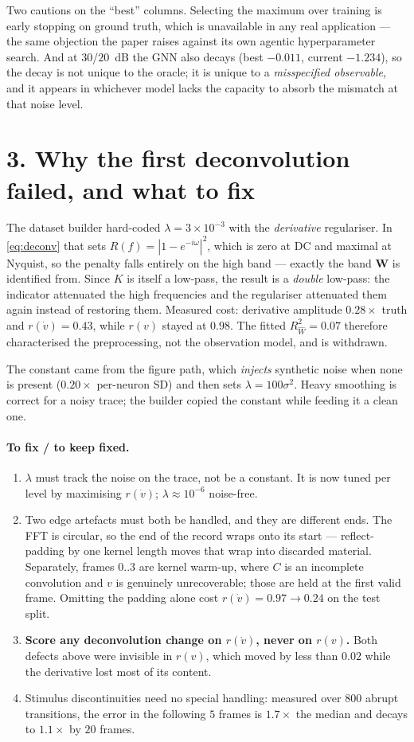\documentclass[10pt]{article}
\newcommand{\Rw}{R^2_{\widehat W}}
\newcommand{\Mat}[1]{\mathbf{#1}}
\begin{document}
Two cautions on the ``best'' columns. Selecting the maximum over training is
early stopping on ground truth, which is unavailable in any real application ---
the same objection the paper raises against its own agentic hyperparameter
search. And at $30$/$20$~dB the GNN also decays (best $-0.011$, current $-1.234$),
so the decay is not unique to the oracle; it is unique to a \emph{misspecified
observable}, and it appears in whichever model lacks the capacity to absorb the
mismatch at that noise level.

\section*{3. Why the first deconvolution failed, and what to fix}

The dataset builder hard-coded $\lambda = 3\times10^{-3}$ with the
\emph{derivative} regulariser. In \eqref{eq:deconv} that sets
$R(f) = |1-e^{-i\omega}|^2$, which is zero at DC and maximal at Nyquist, so the
penalty falls entirely on the high band --- exactly the band $\Mat{W}$ is
identified from. Since $K$ is itself a low-pass, the result is a \emph{double}
low-pass: the indicator attenuated the high frequencies and the regulariser
attenuated them again instead of restoring them. Measured cost: derivative
amplitude $0.28\times$ truth and $r(\dot v) = 0.43$, while $r(v)$ stayed at
$0.98$. The fitted $\Rw = 0.07$ therefore characterised the preprocessing, not
the observation model, and is withdrawn.

The constant came from the figure path, which \emph{injects} synthetic noise when
none is present ($0.20 \times$ per-neuron SD) and then sets $\lambda = 100\sigma^2$.
Heavy smoothing is correct for a noisy trace; the builder copied the constant
while feeding it a clean one.

\paragraph{To fix / to keep fixed.}
\begin{enumerate}\itemsep1pt
\item $\lambda$ must track the noise on the trace, not be a constant. It is now
tuned per level by maximising $r(\dot v)$; $\lambda \approx 10^{-6}$ noise-free.
\item Two edge artefacts must both be handled, and they are different ends. The
FFT is circular, so the end of the record wraps onto its start --- reflect-padding
by one kernel length moves that wrap into discarded material. Separately, frames
$0..3$ are kernel warm-up, where $C$ is an incomplete convolution and $v$ is
genuinely unrecoverable; those are held at the first valid frame. Omitting the
padding alone cost $r(\dot v) = 0.97 \to 0.24$ on the test split.
\item \textbf{Score any deconvolution change on $r(\dot v)$, never on $r(v)$.}
Both defects above were invisible in $r(v)$, which moved by less than $0.02$ while
the derivative lost most of its content.
\item Stimulus discontinuities need no special handling: measured over $800$
abrupt transitions, the error in the following $5$ frames is $1.7\times$ the
median and decays to $1.1\times$ by $20$ frames.
\end{enumerate}
\end{document}
